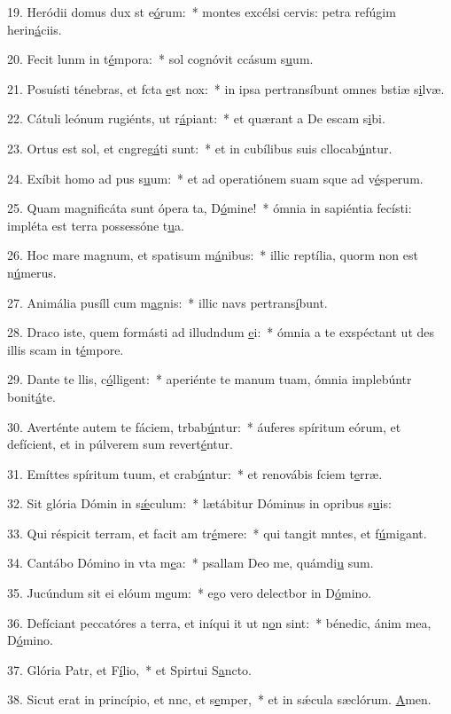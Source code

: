 19. Heródii domus dux st e\uline{ó}rum:~* montes excélsi cervis: petra refúgim herin\uline{á}ciis.\par 
20. Fecit lunm in t\uline{é}mpora:~* sol cognóvit ccásum s\uline{u}um.\par 
21. Posuísti ténebras, et fcta \uline{e}st nox:~* in ipsa pertransíbunt omnes bstiæ s\uline{i}lvæ.\par 
22. Cátuli leónum rugiénts, ut r\uline{á}piant:~* et quærant a De escam s\uline{i}bi.\par 
23. Ortus est sol, et cngreg\uline{á}ti sunt:~* et in cubílibus suis cllocab\uline{ú}ntur.\par 
24. Exíbit homo ad pus s\uline{u}um:~* et ad operatiónem suam sque ad v\uline{é}sperum.\par 
25. Quam magnificáta sunt ópera ta, D\uline{ó}mine!~* ómnia in sapiéntia fecísti: impléta est terra possessóne t\uline{u}a.\par 
26. Hoc mare magnum, et spatisum m\uline{á}nibus:~* illic reptília, quorm non est n\uline{ú}merus.\par 
27. Animália pusíll cum m\uline{a}gnis:~* illic navs pertrans\uline{í}bunt.\par 
28. Draco iste, quem formásti ad illudndum \uline{e}i:~* ómnia a te exspéctant ut des illis scam in t\uline{é}mpore.\par 
29. Dante te llis, c\uline{ó}lligent:~* aperiénte te manum tuam, ómnia implebúntr bonit\uline{á}te.\par 
30. Averténte autem te fáciem, trbab\uline{ú}ntur:~* áuferes spíritum eórum, et defícient, et in púlverem sum revert\uline{é}ntur.\par 
31. Emíttes spíritum tuum, et crab\uline{ú}ntur:~* et renovábis fciem t\uline{e}rræ.\par 
32. Sit glória Dómin in s\uline{ǽ}culum:~* lætábitur Dóminus in opribus s\uline{u}is:\par 
33. Qui réspicit terram, et facit am tr\uline{é}mere:~* qui tangit mntes, et f\uline{ú}migant.\par 
34. Cantábo Dómino in vta m\uline{e}a:~* psallam Deo me, quámdi\uline{u} sum.\par 
35. Jucúndum sit ei elóum m\uline{e}um:~* ego vero delectbor in D\uline{ó}mino.\par 
36. Defíciant peccatóres a terra, et iníqui it ut n\uline{o}n sint:~* bénedic, ánim mea, D\uline{ó}mino.\par 
37. Glória Patr, et F\uline{í}lio,~* et Spirtui S\uline{a}ncto.\par 
38. Sicut erat in princípio, et nnc, et s\uline{e}mper,~* et in sǽcula sæclórum. \uline{A}men.\par 
